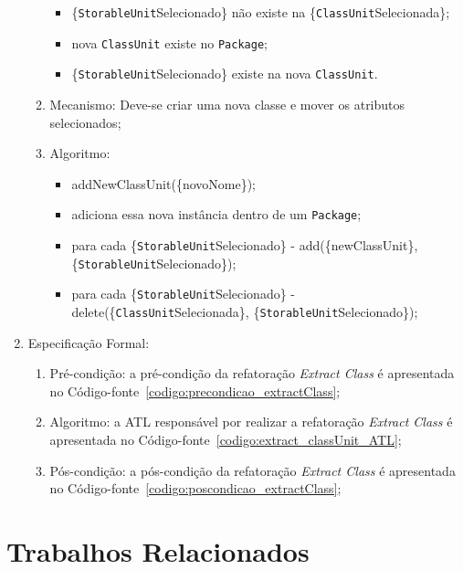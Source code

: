 \begin{enumerate}
\begin{enumerate}
\begin{itemize}
			        \item \{\texttt{StorableUnit}Selecionado\} não existe na \{\texttt{ClassUnit}Selecionada\};
			        \item nova \texttt{ClassUnit} existe no \texttt{Package};
			        \item \{\texttt{StorableUnit}Selecionado\} existe na nova \texttt{ClassUnit}.
			    \end{itemize}
			\item Mecanismo: Deve-se criar uma nova classe e mover os atributos selecionados;
			\item Algoritmo: 
			    \begin{itemize}
			        \item addNewClassUnit(\{novoNome\});
			        \item adiciona essa nova instância dentro de um \texttt{Package};
			        \item para cada \{\texttt{StorableUnit}Selecionado\} - add(\{newClassUnit\}, \{\texttt{StorableUnit}\-Selecionado\});
			        \item para cada \{\texttt{StorableUnit}Selecionado\} - delete(\{\texttt{ClassUnit}Selecionada\}, \{\texttt{Storable\-Unit}Selecionado\});
			    \end{itemize} 
	    \end{enumerate}
		\item Especificação Formal:
		\begin{enumerate}
			\item Pré-condição: a pré-condição da refatoração \textit{Extract Class} é apresentada no Código-fonte~\ref{codigo:precondicao_extractClass};
			\item Algoritmo: a ATL responsável por realizar a refatoração \textit{Extract Class} é apresentada no Código-fonte~\ref{codigo:extract_classUnit_ATL};
			\item Pós-condição: a pós-condição da refatoração \textit{Extract Class} é apresentada no Código-fonte~\ref{codigo:poscondicao_extractClass};
		\end{enumerate}
\end{enumerate}


\section{Trabalhos Relacionados}\label{sec:trabalhos_relacionados_abordagem_criar_kdm}

